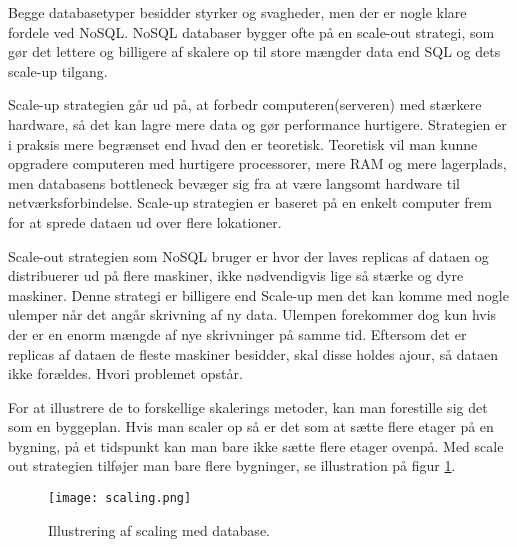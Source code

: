 Begge databasetyper besidder styrker og svagheder, men der er nogle klare fordele ved NoSQL. NoSQL databaser bygger ofte på en scale-out strategi, som gør det lettere og billigere af skalere op til store mængder data end SQL og dets scale-up tilgang.

Scale-up strategien går ud på, at forbedr computeren(serveren) med stærkere hardware, så det kan lagre mere data og gør performance hurtigere. Strategien er i praksis mere begrænset end hvad den er teoretisk. Teoretisk vil man kunne opgradere computeren med hurtigere processorer, mere RAM og mere lagerplads, men databasens bottleneck bevæger sig fra at være langsomt hardware til netværksforbindelse. Scale-up strategien er baseret på en enkelt computer frem for at sprede dataen ud over flere lokationer.

Scale-out strategien som NoSQL bruger er hvor der laves replicas af dataen og distribuerer ud på flere maskiner, ikke nødvendigvis lige så stærke og dyre maskiner. Denne strategi er billigere end Scale-up men det kan komme med nogle ulemper når det angår skrivning af ny data. Ulempen forekommer dog kun hvis der er en enorm mængde af nye skrivninger på samme tid. Eftersom det er replicas af dataen de fleste maskiner besidder, skal disse holdes ajour, så dataen ikke forældes. Hvori problemet opstår.

For at illustrere de to forskellige skalerings metoder, kan man forestille sig det som en byggeplan. Hvis man scaler op så er det som at sætte flere etager på en bygning, på et tidspunkt kan man bare ikke sætte flere etager ovenpå. Med scale out strategien tilføjer man bare flere bygninger, se illustration på figur \ref{fig::scaling}. 

\begin{figure}
    \centering
    \texttt{[image: scaling.png]}
    \caption{Illustrering af scaling med database.}
    \label{fig::scaling}
\end{figure}

